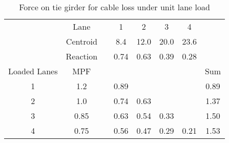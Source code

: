 \begin{table}[H]
\centering
\caption{Force on tie girder for cable loss under unit lane load}
\label{tab:app_ll_cable_loss}
\begin{tabular}{cccccccc}
\cline{2-7}
             & Lane     &  & 1    & 2    & 3    & 4    &      \\
             & Centroid &  & 8.4  & 12.0 & 20.0 & 23.6 &      \\
             & Reaction &  & 0.74 & 0.63 & 0.39 & 0.28 &      \\ \hline
Loaded Lanes & MPF      &  &      &      &      &      & Sum  \\ \hline
1            & 1.2      &  & 0.89 &      &      &      & 0.89 \\
2            & 1.0      &  & 0.74 & 0.63 &      &      & 1.37 \\
3            & 0.85     &  & 0.63 & 0.54 & 0.33 &      & 1.50 \\
4            & 0.75     &  & 0.56 & 0.47 & 0.29 & 0.21 & 1.53 \\ \hline
\end{tabular}
\end{table}